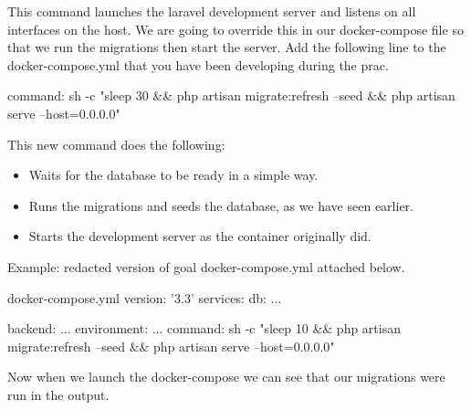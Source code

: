 \documentclass{csse4400}
\begin{document}

This command launches the laravel development server and listens on all interfaces on the host. We are going to override
this in our docker-compose file so that we run the migrations then start the server. Add the following line to the 
docker-compose.yml that you have been developing during the prac.

\begin{code}[language=docker-compose]{}
  command: sh -c "sleep 30 && php artisan migrate:refresh --seed && php artisan serve --host=0.0.0.0"
\end{code}

This new command does the following:

\begin{itemize}
  \item Waits for the database to be ready in a simple way.
  \item Runs the migrations and seeds the database, as we have seen earlier.
  \item Starts the development server as the container originally did.
\end{itemize}

Example: redacted version of goal docker-compose.yml attached below.

\begin{code}[language=docker-compose]{docker-compose.yml}
  version: '3.3'
  services:
    db:
      ...
  
    backend:
      ...
      environment:
        ...
      command: sh -c "sleep 10 && php artisan migrate:refresh --seed && php artisan serve --host=0.0.0.0"
\end{code}

Now when we launch the docker-compose we can see that our migrations were run in the output.

\end{document}
